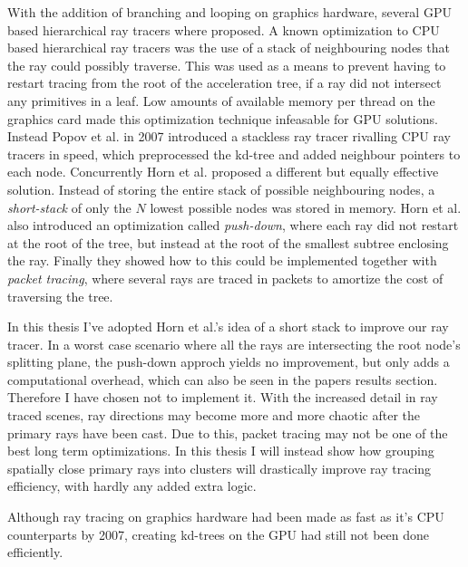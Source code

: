 With the addition of branching and looping on graphics hardware,
several GPU based hierarchical ray tracers where proposed. A known
optimization to CPU based hierarchical ray tracers was the use of a
stack of neighbouring nodes that the ray could possibly traverse. This
was used as a means to prevent having to restart tracing from the root
of the acceleration tree, if a ray did not intersect any primitives in
a leaf. Low amounts of available memory per thread on the graphics
card made this optimization technique infeasable for GPU
solutions. Instead Popov et al. in 2007
introduced a stackless ray tracer rivalling CPU ray tracers in speed,
which preprocessed the kd-tree and added neighbour pointers to each
node. Concurrently Horn et al. proposed a different
but equally effective solution. Instead of storing the entire stack of
possible neighbouring nodes, a \textit{short-stack} of only the $N$
lowest possible nodes was stored in memory. Horn et al. also
introduced an optimization called \textit{push-down}, where each ray
did not restart at the root of the tree, but instead at the root of
the smallest subtree enclosing the ray. Finally they showed how to
this could be implemented together with \textit{packet tracing}, where
several rays are traced in packets to amortize the cost of traversing
the tree.

In this thesis I've adopted Horn et al.'s idea of a short stack to
improve our ray tracer. In a worst case scenario where all the rays
are intersecting the root node's splitting plane, the push-down approch
yields no improvement, but only adds a computational overhead, which
can also be seen in the papers results section. Therefore I have
chosen not to implement it. With the increased detail in ray traced
scenes, ray directions may become more and more chaotic after the
primary rays have been cast. Due to this, packet tracing may not be
one of the best long term optimizations. In this thesis I will instead
show how grouping spatially close primary rays into clusters will
drastically improve ray tracing efficiency, with hardly any added
extra logic.



Although ray tracing on graphics hardware had been made as fast as
it's CPU counterparts by 2007, creating kd-trees on the GPU had still
not been done efficiently.


